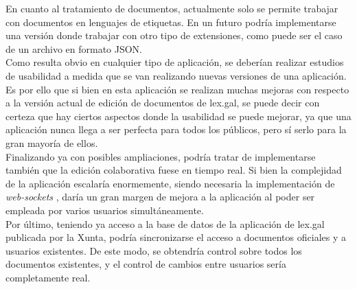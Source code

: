 En cuanto al tratamiento de documentos, actualmente solo se permite trabajar con documentos en lenguajes de etiquetas. En un futuro podría implementarse una versión donde trabajar con otro tipo de extensiones, como puede ser el caso de un archivo en formato JSON.
\\

Como resulta obvio en cualquier tipo de aplicación, se deberían realizar estudios de usabilidad a medida que se van realizando nuevas versiones de una aplicación. Es por ello que si bien en esta aplicación se realizan muchas mejoras con respecto a la versión actual de edición de documentos de lex.gal, se puede decir con certeza que hay ciertos aspectos donde la usabilidad se puede mejorar, ya que una aplicación nunca llega a ser perfecta para todos los públicos, pero sí serlo para la gran mayoría de ellos.
\\

Finalizando ya con posibles ampliaciones, podría tratar de implementarse también que la edición colaborativa fuese en tiempo real. Si bien la complejidad de la aplicación escalaría enormemente, siendo necesaria la implementación de {\it web-sockets} \cite{websocket}, daría un gran margen de mejora a la aplicación al poder ser empleada por varios usuarios simultáneamente.
\\

Por último, teniendo ya acceso a la base de datos de la aplicación de lex.gal publicada por la Xunta, podría sincronizarse el acceso a documentos oficiales y a usuarios existentes. De este modo, se obtendría control sobre todos los documentos existentes, y el control de cambios entre usuarios sería completamente real.